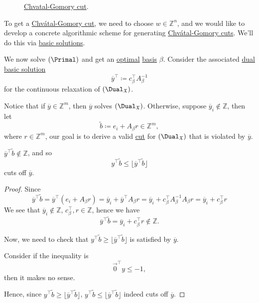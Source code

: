 \begin{figure}[H]
	\centering
	\begin{center}
	\end{center}
	\caption{\hyperref[def:Chvatal-Gomory-cut]{Chvatal-Gomory cut}.}
	\label{fig:Chvatal-Gomory-cut}
\end{figure}

\begin{remark}
	To get a \hyperref[def:Chvatal-Gomory-cut]{Chvátal-Gomory cut}, we need to choose \(w\in \mathbb{Z} ^n\), and we would like to develop a concrete algorithmic scheme for generating \hyperref[def:Chvatal-Gomory-cut]{Chvátal-Gomory cuts}. We'll do this via \hyperref[def:basic-solution]{basic solutions}.
\end{remark}

We now solve \((\Primal)\) and get an \hyperref[def:optimal-solution]{optimal} \hyperref[def:basis]{basis} \(\beta\). Consider the associated \hyperref[def:dual-basic-solution]{dual basic solution}
\[
	\overline{y}^{\top}\coloneqq c_{\beta}^{\top}A^{-1}_{\beta}
\]
for the continuous relaxation of \((\Dual_{\mathfrak{X}})\).

Notice that if \(\overline{y}\in\mathbb{Z}^m\), then \(\overline{y}\) solves \((\Dual_{\mathfrak{X}})\). Otherwise, suppose \(\overline{y}_{i}\notin \mathbb{Z}\), then let
\[
	\widetilde{b}\coloneqq e_{i} + A_{\beta}r\in\mathbb{Z}^m,
\]
where \(r\in\mathbb{Z}^m\), our goal is to derive a valid \hyperref[def:Chvatal-Gomory-cut]{cut} for \((\Dual_{\mathfrak{X}})\) that is violated by \(\overline{y} \).

\begin{theorem}\label{thm:lec24-1}
	\(\overline{y}^{\top}\widetilde{b}\notin \mathbb{Z}\), and so
	\[
		y^{\top}\widetilde{b}\leq \lfloor \overline{y}^{\top}\widetilde{b} \rfloor
	\]
	cuts off \(\overline{y}\).
\end{theorem}
\begin{proof}
	Since
	\[
		\overline{y}^{\top}\widetilde{b} = \overline{y}^{\top}(e_{i}+A_{\beta}r) = \overline{y}_{i} + \overline{y}^{\top}A_{\beta}r = \overline{y}_{i} +c_{\beta}^{\top}A^{-1}_{\beta}A_{\beta}r = \overline{y}_{i} +c^{\top}_{\beta}r
	\]
	We see that \(\overline{y}_{i}\notin\mathbb{Z}\), \(c_{\beta}^{\top}, r\in \mathbb{Z}\), hence we have
	\[
		\overline{y}^{\top}\widetilde{b} = \overline{y}_{i}+c^{\top}_{\beta}r\notin \mathbb{Z}.
	\]

	Now, we need to check that \(y^{\top}\widetilde{b}\geq \lfloor \overline{y}^{\top}\widetilde{b} \rfloor\) is satisfied by \(\overline{y}\).

	\begin{intuition}
		Consider if the inequality is
		\[
			\vec{0}^{\top}y\leq -1,
		\]
		then it makes no sense.
	\end{intuition}
	Hence, since \(y^{\top}\widetilde{b}\geq \lfloor \overline{y}^{\top}\widetilde{b} \rfloor\), \(y^{\top}\widetilde{b}\leq \lfloor \overline{y}^{\top}\widetilde{b} \rfloor\)
	indeed cuts off \(\overline{y} \).
\end{proof}

